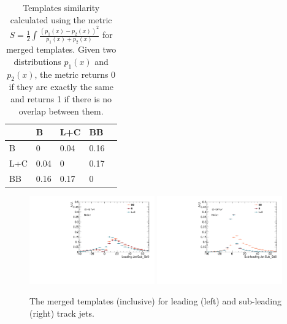 \begin{table}[htpb]
\centering
\begin{tabular}{|l|l|l|l|l|}
\hline
    & B    & L+C    & BB   \\ \hline
B   & 0    & 0.04  & 0.16 \\ \hline
L+C & 0.04 & 0     & 0.17 \\ \hline
BB  & 0.16 & 0.17  & 0    \\ \hline

\end{tabular}
\caption{Templates similarity calculated using the metric $S=\frac{1}{2}\int \frac{(p_1(x)-p_2(x))^2}{p_1(x)+p_2(x)}$ for merged templates. Given two distributions $p_1(x)$ and $p_2(x)$, the metric returns 0 if they are exactly the same and returns 1 if there is no overlap between them.}
\label{tab:overlap-merged}
\end{table}


\begin{figure}[htbp]
  \centering
 \includegraphics[width=0.48\textwidth]{figures/gbb/Sub_Sd0_Fits/Canv_FitTemplate_Inclusive_x.pdf}
 \includegraphics[width=0.48\textwidth]{figures/gbb/Sub_Sd0_Fits/Canv_FitTemplate_Inclusive_y.pdf}\\
\caption{The merged \subsdzero templates (inclusive) for leading (left) and sub-leading (right) track jets.}
  \label{fig:gbb-templates}
\end{figure}


